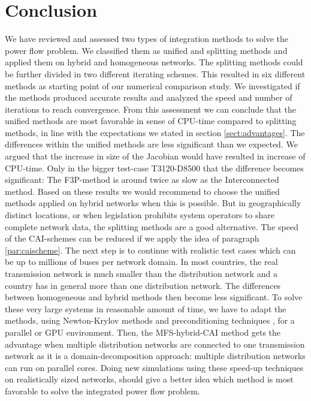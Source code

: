 \documentclass[10pt,journal]{article}
\begin{document}
\section{Conclusion}
We have reviewed and assessed two types of integration methods to solve the power flow problem. We classified them as unified and splitting methods and applied them on hybrid and homogeneous networks. The splitting methods could be further divided in two different iterating schemes. This resulted in six different methods as starting point of our numerical comparison study. We investigated if the methods produced accurate results and analyzed the speed and number of iterations to reach convergence. \newline
From this assessment we can conclude that the unified methods are most favorable in sense of CPU-time compared to splitting methods, in line with the expectations we stated in section \ref{sect:advantages}. The differences within the unified methods are less significant than we expected. We argued that the increase in size of the Jacobian would have resulted in increase of CPU-time. Only in the bigger test-case T3120-D8500 that the difference becomes significant: The F3P-method is around twice as slow as the Interconnected method. \newline 
Based on these results we would recommend to choose the unified methods applied on hybrid networks when this is possible. But in geographically distinct locations, or when legislation prohibits system operators to share complete network data, the splitting methods are a good alternative. The speed of the CAI-schemes can be reduced if we apply the idea of paragraph \ref{par:caischeme}. \newline\newline
The next step is to continue with realistic test cases which can be up to millions of buses per network domain. In most countries, the real transmission network is much smaller than the distribution network and a country has in general more than one distribution network. The differences between homogeneous and hybrid methods then become less significant.  To solve these very large systems in reasonable amount of time, we have to adapt the methods, using Newton-Krylov methods and preconditioning techniques  \cite{Idema2013}, for a parallel or GPU environment. Then, the MFS-hybrid-CAI method gets the advantage when multiple distribution networks are connected to one transmission network as it is a domain-decomposition approach: multiple distribution networks can run on parallel cores. Doing new simulations using these speed-up techniques on realistically sized networks, should give a better idea which method is most favorable to solve the integrated power flow problem. 

\newpage

 
%
\end{document}
